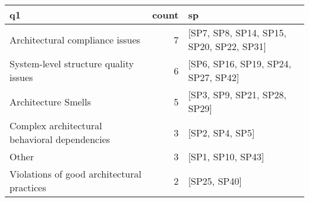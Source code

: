 \begin{tabular}{lrl}
\toprule
                                            q1 &  count &                                        sp \\
\midrule
               Architectural compliance issues &      7 &  [SP7, SP8, SP14, SP15, SP20, SP22, SP31] \\
         System-level structure quality issues &      6 &       [SP6, SP16, SP19, SP24, SP27, SP42] \\
                           Architecture Smells &      5 &              [SP3, SP9, SP21, SP28, SP29] \\
 Complex architectural behavioral dependencies &      3 &                           [SP2, SP4, SP5] \\
                                         Other &      3 &                         [SP1, SP10, SP43] \\
    Violations of good architectural practices &      2 &                              [SP25, SP40] \\
\bottomrule
\end{tabular}
